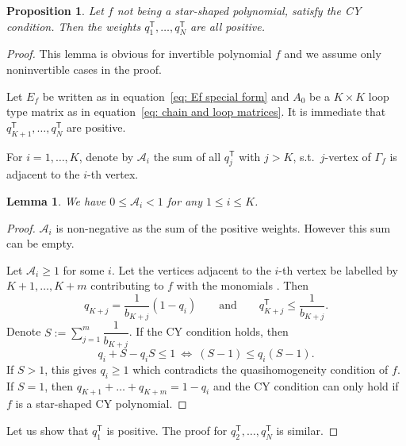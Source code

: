 \documentclass[pdftex]{sigma}
\numberwithin{equation}{section}
\newtheorem{Lemma}[Theorem]{Lemma}
\newtheorem{Proposition}[Theorem]{Proposition}
 { \theoremstyle{definition}
\newtheorem{Definition}[Theorem]{Definition}
\newtheorem{Note}[Theorem]{Note}
\newtheorem{Example}[Theorem]{Example}
\newtheorem{Remark}[Theorem]{Remark} }
\def\A{{\mathcal A}}
\begin{document}
\begin{Proposition}
 Let $f$ not being a star-shaped polynomial, satisfy the CY condition. Then the weights $q_1^{\mathsf{T}}, \dots, q_N^{\mathsf{T}}$ are all positive.
\end{Proposition}
\begin{proof}
 This lemma is obvious for invertible polynomial $f$ and we assume only noninvertible cases in the proof.

 Let $E_f$ be written as in equation~\eqref{eq: Ef special form} and $A_0$ be a $K \times K$ loop type matrix as in equation~\eqref{eq: chain and loop matrices}. It is immediate that $q_{K+1}^{\mathsf{T}},\dots,q_N^{\mathsf{T}}$ are positive.

 For $i=1,\dots,K$, denote by $\A_i$ the sum of all $q_j^{\mathsf{T}}$ with $j > K$, s.t.\ $j$-vertex of $\Gamma_f$ is adjacent to the $i$-th vertex.

 \begin{Lemma}
 We have $0 \le \A_i < 1$ for any $1 \le i \le K$.
 \end{Lemma}
 \begin{proof}
 $\A_i$ is non-negative as the sum of the positive weights. However this sum can be empty.

 Let $\A_i \ge 1$ for some $i$. Let the vertices adjacent to the $i$-th vertex be labelled by $K+1,\dots,K+m$ contributing to $f$ with the monomials .
 Then
 \[
 q_{K+j} = \frac{1}{b_{K+j}}(1 - q_i) \qquad \text{and} \qquad q_{K+j}^{\mathsf{T}} \le \frac{1}{b_{K+j}}.
 \]
 Denote $S := \sum_{j=1}^m \dfrac{1}{b_{K+j}}$. If the CY condition holds, then
 \[
 q_i + S - q_i S \le 1 \ \Leftrightarrow \ (S - 1) \le q_i(S-1).
 \]
 If $S > 1$, this gives $q_i \ge 1$ which contradicts the quasihomogeneity condition of $f$. If $S=1$, then $q_{K+1} + \dots + q_{K+m} = 1 - q_i$ and the CY condition can only hold if $f$ is a star-shaped CY polynomial.
 \end{proof}

 Let us show that $q_1^{\mathsf{T}}$ is positive. The proof for $q_2^{\mathsf{T}},\dots,q_N^{\mathsf{T}}$ is similar.


\end{proof}
\end{document}
